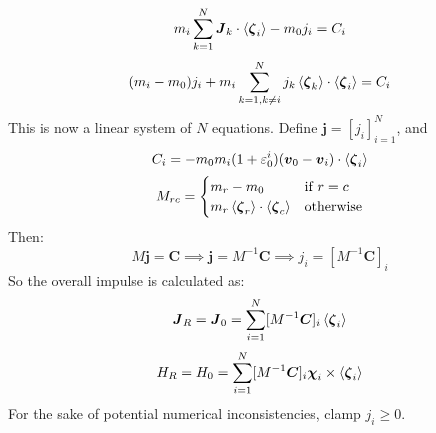 \documentclass[10pt]{report}
\begin{document}
\begin{equation}m_i\sum_{k=1}^N\boldsymbol{J}_k\cdot\braket{\boldsymbol{\zeta}_i}-m_0j_i=C_i\end{equation}
\begin{equation}(m_i-m_0)j_i+m_i\sum_{k=1,k\neq i}^Nj_k\braket{\boldsymbol{\zeta}_k}\cdot\braket{\boldsymbol{\zeta}_i}=C_i\end{equation}
This is now a linear system of $N$ equations. Define $\boldsymbol{j}=[j_i]_{i=1}^N$, and
\begin{equation}C_i=-m_0m_i(1+\varepsilon_0^i)(\boldsymbol{v}_0-\boldsymbol{v}_i)\cdot\braket{\boldsymbol{\zeta}_i}\end{equation}
\begin{equation}M_{rc}=\begin{cases}m_r-m_0&\mbox{if }r=c\\m_r\braket{\boldsymbol{\zeta}_r}\cdot\braket{\boldsymbol{\zeta}_c}&\mbox{otherwise}\end{cases}\end{equation}
Then:
\begin{equation}M\boldsymbol{j}=\boldsymbol{C}\implies\boldsymbol{j}=M^{-1}\boldsymbol{C}\implies j_i=[M^{-1}\boldsymbol{C}]_i\end{equation}
So the overall impulse is calculated as:
\begin{equation}\boldsymbol{J}_R=\boldsymbol{J}_0=\sum_{i=1}^N[M^{-1}\boldsymbol{C}]_i\braket{\boldsymbol{\zeta}_i}\end{equation}
\begin{equation}H_R=H_0=\sum_{i=1}^N[M^{-1}\boldsymbol{C}]_i\boldsymbol{\chi}_i\times\braket{\boldsymbol{\zeta}_i}\end{equation}
For the sake of potential numerical inconsistencies, clamp $j_i\geq0$.
\end{document}
